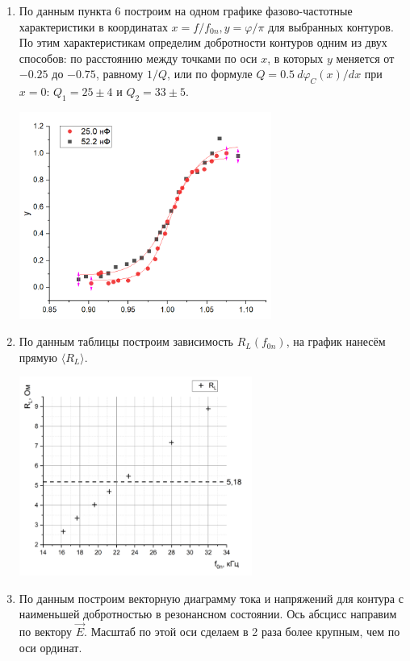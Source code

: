 \documentclass[a4paper,12pt]{article}
\begin{document}
\begin{enumerate}
\begin{center}
\end{center}
\item По данным пункта 6 построим на одном графике фазово-частотные характеристики в координатах $x = f/f_{0n}, y = \varphi /\pi$ для выбранных контуров. По этим характеристикам определим добротности контуров одним из двух способов: по расстоянию между
точками по оси $x$, в которых $y$ меняется от $-0.25$ до $-0.75$, равному $1/Q$, или по формуле $Q = 0.5~d\varphi_C(x)/dx$ при $x=0$: $Q_1 = 25 \pm 4$ и $Q_2 = 33 \pm 5$.
\begin{center}
\includegraphics[width = 0.65\textwidth]{4.png}
\end{center}
\item По данным таблицы построим зависимость $R_L(f_{0n})$, на график нанесём прямую $\langle R_L \rangle$.
\begin{center}
\includegraphics[width = 0.6\textwidth]{5.png}
\end{center}
\item По данным построим векторную диаграмму тока
и напряжений для контура с наименьшей добротностью в резонансном состоянии. Ось
абсцисс направим по вектору $\vec{E}$. Масштаб по этой оси сделаем в 2 раза более крупным,
чем по оси ординат.
\end{enumerate}
\end{document}
